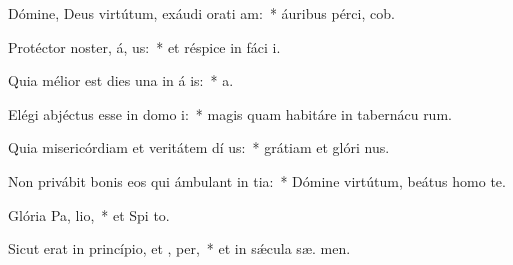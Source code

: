 \item Dómine, Deus virtútum, exáudi orati am:~* áuribus pérci,  cob.
\item Protéctor noster, á, us:~* et réspice in fáci  i.
\item Quia mélior est dies una in á is:~*  a.
\item Elégi abjéctus esse in domo  i:~* magis quam habitáre in tabernácu rum.
\item Quia misericórdiam et veritátem dí us:~* grátiam et glóri  nus.
\item Non privábit bonis eos qui ámbulant in tia:~* Dómine virtútum, beátus homo    te.
\item Glória Pa,  lio,~* et Spi to.
\item Sicut erat in princípio, et ,  per,~* et in sǽcula sæ. men.
